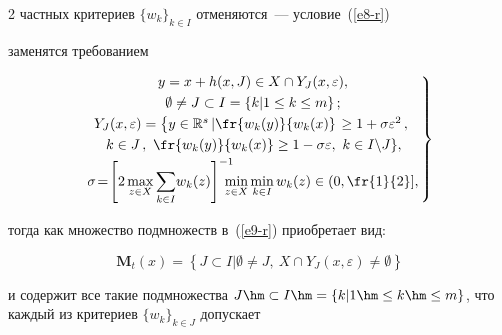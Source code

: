 \begin{multicols}{2}
частных критериев $\{w_k\}_{k\in I}$ отменяются~--- условие~(\ref{e8-r}) 


заменятся требованием


  \begin{equation}


  \left.


  \begin{array}{c}


 \!\! \!\!\!\! y=x+h(x,J) \in X \cap Y_J(x,\varepsilon),\\[3pt]


  \!\! \!\!\!\! \emptyset \not= J\subset I= \{k\vert 1\leq k\leq m\}\,;\\[3pt]


  \!\! \!\!\!\!Y_J(x,\varepsilon) =\left\{ y\in \mathbb{R}^s\left\vert 


\fr{w_k(y)}{w_k(x)}\right. \geq 1+\sigma\varepsilon^2\,,\right.\\[3pt]


 \!\!  \!\!\!\!\left. k\in J\,,\ \fr{w_k(y)}{w_k(x)}\geq 1-\sigma\varepsilon,\ k\in I\backslash 


J\right\}\!,\\[3pt]


 \!\!\!\!\!\! \sigma\!=\! \left[ 2\max\limits_{z\in X}\displaystyle \sum\limits_{k\in I}\! w_k(z)\right]^{-1}


  \!\!\!\!\!\min\limits_{z\in X} \min\limits_{k\in I} w_k(z)\in \left(0, \fr{1}{2}\right]\!,


  \end{array}\!\!


  \right\}\!\!\!


  \label{e12-r}


  \end{equation}


тогда как множество подмножеств в~(\ref{e9-r}) приобретает вид:


\begin{equation}


\mathbf{M}_t(x)=\left\{ J\subset I\vert \emptyset \not= J,\ X\cap 


Y_J(x,\varepsilon)\not= \emptyset\right\}


\label{e13-r}


\end{equation}


и содержит все такие подмножества $J\hm\subset I\hm= \{ k\vert 1\hm\leq 


k\hm\leq m\}$, что каждый из критериев $\{ w_k\}_{k\in J}$ допускает 



\end{multicols}
